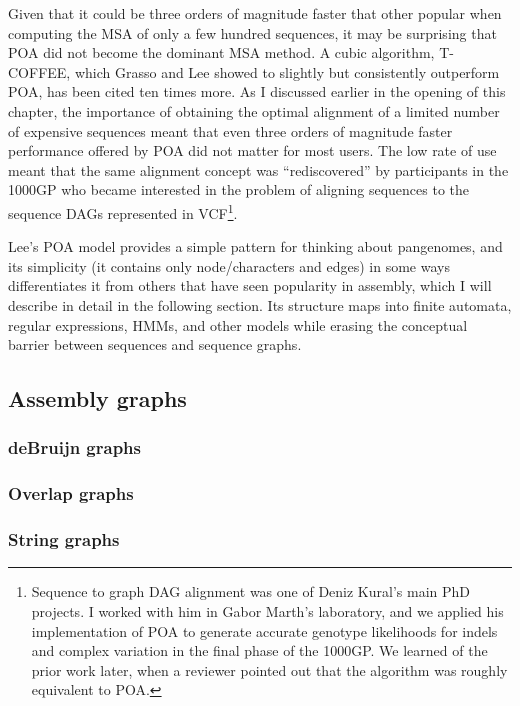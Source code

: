 Given that it could be three orders of magnitude faster that other popular when computing the MSA of only a few hundred sequences, it may be surprising that POA did not become the dominant MSA method.
A cubic algorithm, T-COFFEE, which Grasso and Lee showed to slightly but consistently outperform POA, has been cited ten times more.
As I discussed earlier in the opening of this chapter, the importance of obtaining the optimal alignment of a limited number of expensive sequences meant that even three orders of magnitude faster performance offered by POA did not matter for most users.
The low rate of use meant that the same alignment concept was ``rediscovered'' by participants in the 1000GP who became interested in the problem of aligning sequences to the sequence DAGs represented in VCF\footnote{Sequence to graph DAG alignment was one of Deniz Kural's main PhD projects. I worked with him in Gabor Marth's laboratory, and we applied his implementation of POA to generate accurate genotype likelihoods for indels and complex variation in the final phase of the 1000GP. We learned of the prior work later, when a reviewer pointed out that the algorithm was roughly equivalent to POA.}.

Lee's POA model provides a simple pattern for thinking about pangenomes, and its simplicity (it contains only node/characters and edges) in some ways differentiates it from others that have seen popularity in assembly, which I will describe in detail in the following section.
Its structure maps into finite automata, regular expressions, HMMs, and other models while erasing the conceptual barrier between sequences and sequence graphs.

\subsection{Assembly graphs}

\subsubsection{deBruijn graphs}

\subsubsection{Overlap graphs}

\subsubsection{String graphs}

